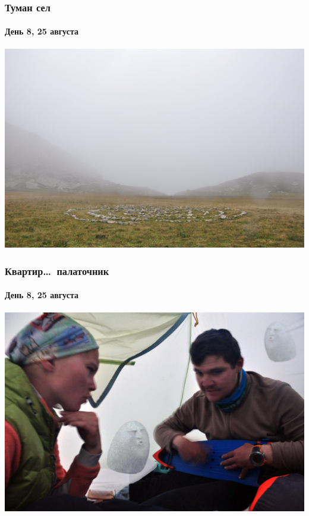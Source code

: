\begin{frame}
	\frametitle{Туман сел}
	\framesubtitle{День 8, 25 августа}
	\centering
	\includegraphics[width=\textwidth]{../pics/DSC_0181}			
\end{frame}

\begin{frame}
	\frametitle{Квартир\dots~палаточник}
	\framesubtitle{День 8, 25 августа}
	\centering
	\includegraphics[width=\textwidth]{../pics/DSC_0187}			
\end{frame}